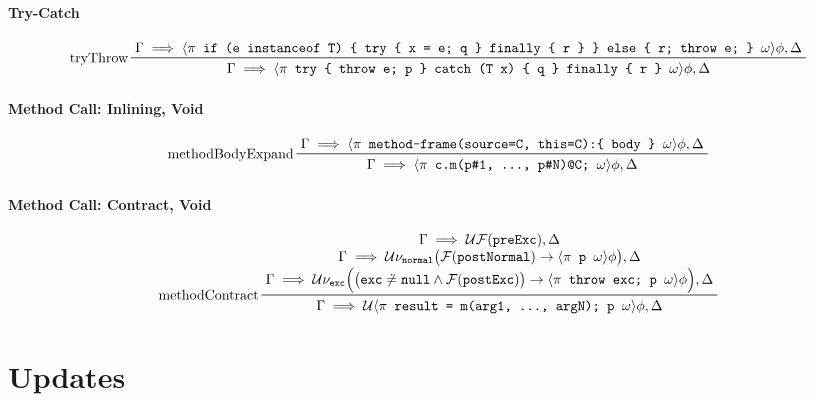 \paragraph{Try-Catch} %
{ \footnotesize \begin{equation*}
		\prftree[l]
		{tryThrow}
		{\Gamma \implies \langle \pi \texttt{ if (e instanceof T) \{ try \{ x = e; q \} finally \{ r \} \} else \{ r; throw e; \} } \omega \rangle \phi, \Delta}
		{\Gamma \implies \langle \pi \texttt{ try \{ throw e; p \} catch (T x) \{ q \} finally \{ r \} } \omega \rangle \phi, \Delta}
	\end{equation*} }

\paragraph{Method Call: Inlining, Void} %
	\begin{equation*}
		\prftree[l]
		{methodBodyExpand}
		{\Gamma \implies \langle \pi \texttt{ method-frame(source=C, this=C):\{ body \} } \omega \rangle \phi, \Delta}
		{\Gamma \implies \langle \pi \texttt{ c.m(p\#1, ..., p\#N)@C; } \omega\rangle \phi, \Delta}
	\end{equation*}

	\paragraph{Method Call: Contract, Void} %
		\begin{equation*}
			\prftree[l]
			{methodContract}
			{\let\scriptstyle\textstyle \substack{
					\Gamma \implies \mathcal{U} \mathcal{F}(\texttt{preExc}), \Delta \\
					\Gamma \implies \mathcal{U} \nu_\texttt{normal} \big( \mathcal{F}(\texttt{postNormal}) \to \langle \pi \texttt{ p } \omega \rangle \phi \big), \Delta \\
					\Gamma \implies \mathcal{U} \nu_\texttt{exc} \Big( \big( \texttt{exc} \not\doteq \texttt{null} \land \mathcal{F}(\texttt{postExc}) \big) \to \langle \pi \texttt{ throw exc; p } \omega \rangle \phi \Big), \Delta}}
			{\Gamma \implies \mathcal{U} \langle \pi \texttt{ result = m(arg1, ..., argN); p } \omega \rangle \phi, \Delta}
		\end{equation*}


\section{Updates}

